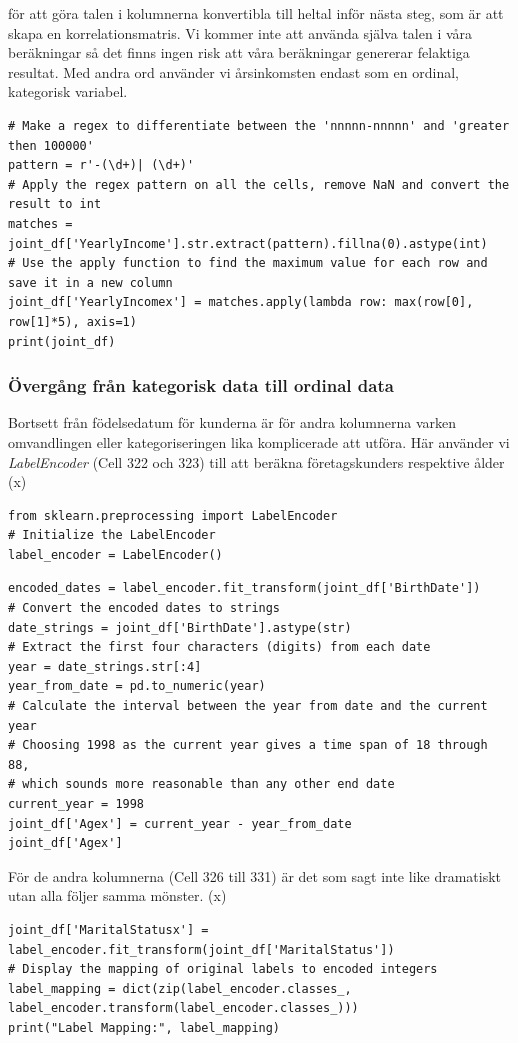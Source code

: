 \documentclass[]{article}
\begin{document}
för att göra talen i kolumnerna konvertibla till heltal inför nästa steg, som är att skapa en korrelationsmatris. Vi kommer inte att använda själva talen i våra beräkningar så det finns ingen risk att våra beräkningar genererar felaktiga resultat. Med andra ord använder vi årsinkomsten endast som en ordinal, kategorisk variabel.
\begin{lstlisting}
# Make a regex to differentiate between the 'nnnnn-nnnnn' and 'greater then 100000'
pattern = r'-(\d+)| (\d+)'
# Apply the regex pattern on all the cells, remove NaN and convert the result to int
matches = joint_df['YearlyIncome'].str.extract(pattern).fillna(0).astype(int)
# Use the apply function to find the maximum value for each row and save it in a new column
joint_df['YearlyIncomex'] = matches.apply(lambda row: max(row[0], row[1]*5), axis=1)
print(joint_df)
\end{lstlisting}

\subsubsection{Övergång från kategorisk data till ordinal data}

Bortsett från födelsedatum för kunderna är för andra kolumnerna varken omvandlingen eller kategoriseringen lika komplicerade att utföra. Här använder vi \emph{LabelEncoder}  (Cell 322 och 323) till att beräkna företagskunders respektive ålder
\if(x)
\begin{lstlisting}
from sklearn.preprocessing import LabelEncoder
# Initialize the LabelEncoder
label_encoder = LabelEncoder()
\end{lstlisting}

\begin{lstlisting}
encoded_dates = label_encoder.fit_transform(joint_df['BirthDate'])
# Convert the encoded dates to strings
date_strings = joint_df['BirthDate'].astype(str)
# Extract the first four characters (digits) from each date
year = date_strings.str[:4]
year_from_date = pd.to_numeric(year)
# Calculate the interval between the year from date and the current year
# Choosing 1998 as the current year gives a time span of 18 through 88,
# which sounds more reasonable than any other end date
current_year = 1998
joint_df['Agex'] = current_year - year_from_date
joint_df['Agex']
\end{lstlisting}
\fi
För de andra kolumnerna (Cell 326 till 331) är det som sagt inte like dramatiskt utan alla följer samma mönster.
\if(x)
\begin{lstlisting}
joint_df['MaritalStatusx'] = label_encoder.fit_transform(joint_df['MaritalStatus'])
# Display the mapping of original labels to encoded integers
label_mapping = dict(zip(label_encoder.classes_, label_encoder.transform(label_encoder.classes_)))
print("Label Mapping:", label_mapping)
\end{lstlisting}
\fi
\end{document}
